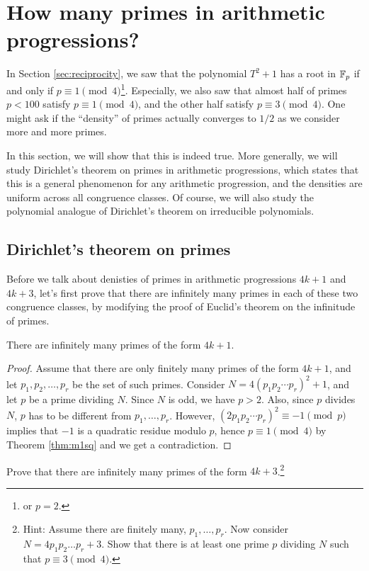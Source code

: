 \section{How many primes in arithmetic progressions?}
\label{sec:dirichlet}

In Section \ref{sec:reciprocity}, we saw that the polynomial $T^2 + 1$ has a root in $\mathbb{F}_p$ if and only if $p \equiv 1 \pmod{4}$\footnote{or $p = 2$.}.
Especially, we also saw that almost half of primes $p < 100$ satisfy $p \equiv 1 \pmod{4}$, and the other half satisfy $p \equiv 3 \pmod{4}$.
One might ask if the ``density'' of primes actually converges to $1/2$ as we consider more and more primes.

In this section, we will show that this is indeed true.
More generally, we will study Dirichlet's theorem on primes in arithmetic progressions, which states that this is a general phenomenon for any arithmetic progression, and the densities are uniform across all congruence classes.
Of course, we will also study the polynomial analogue of Dirichlet's theorem on irreducible polynomials.

\subsection{Dirichlet's theorem on primes}
\label{sec:dirichlet-primes}

Before we talk about denisties of primes in arithmetic progressions $4k + 1$ and $4k + 3$, let's first prove that there are infinitely many primes in each of these two congruence classes, by modifying the proof of Euclid's theorem on the infinitude of primes.
\begin{theorem}
    \label{thm:1m4-prime-infinite}
    There are infinitely many primes of the form $4k + 1$.
\end{theorem}
\begin{proof}
    Assume that there are only finitely many primes of the form $4k + 1$, and let $p_1, p_2, \dots, p_r$ be the set of such primes.
    Consider $N = 4 (p_1 p_2 \cdots p_r)^2 + 1$, and let $p$ be a prime dividing $N$.
    Since $N$ is odd, we have $p > 2$.
    Also, since $p$ divides $N$, $p$ has to be different from $p_1, \dots, p_r$.
    However, $(2 p_1 p_2 \cdots p_r)^2 \equiv -1 \pmod{p}$ implies that $-1$ is a quadratic residue modulo $p$, hence $p \equiv 1 \pmod{4}$ by Theorem \ref{thm:m1sq} and we get a contradiction.
\end{proof}

\begin{exercise}
    Prove that there are infinitely many primes of the form $4k + 3$.\footnote{Hint: Assume there are finitely many, $p_1, \dots, p_r$. Now consider $N = 4p_1 p_2 \dots p_r + 3$. Show that there is at least one prime $p$ dividing $N$ such that $p \equiv 3 \pmod{4}$.}
\end{exercise}

